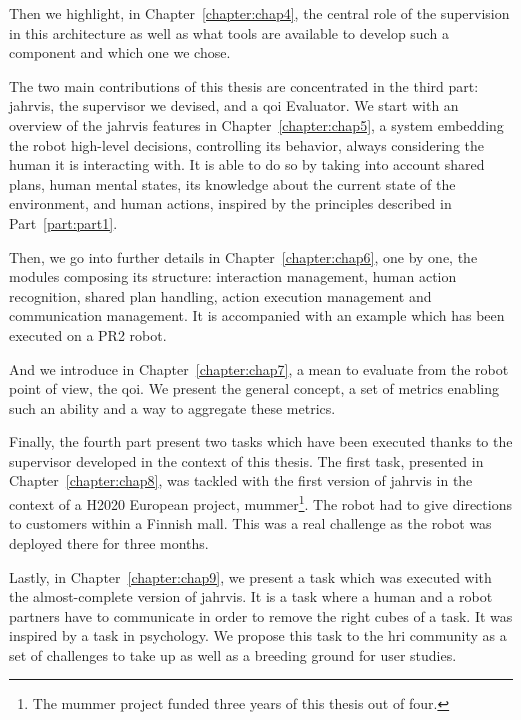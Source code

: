 \documentclass[a4paper,11pt,twoside]{StyleThese}
\begin{document}
Then we highlight, in Chapter~\ref{chapter:chap4}, the central role of the supervision in this architecture as well as what tools are available to develop such a component and which one we chose.

\bigskip

The two main contributions of this thesis are concentrated in the third part: \acrfull{jahrvis}, the supervisor we devised, and a \acrfull{qoi} Evaluator. We start with an overview of the \acrshort{jahrvis} features in Chapter~\ref{chapter:chap5}, \ie a system embedding the robot high-level decisions, controlling its behavior, always considering the human it is interacting with. It is able to do so by taking into account shared plans, human mental states, its knowledge about the current state of the environment, and human actions, inspired by the principles described in Part~\ref{part:part1}. 

Then, we go into further details in Chapter~\ref{chapter:chap6}, one by one, the modules composing its structure: interaction management, human action recognition, shared plan handling, action execution management and communication management. It is accompanied with an example which has been executed on a PR2 robot. 

And we introduce in Chapter~\ref{chapter:chap7}, a mean to evaluate from the robot point of view, the \acrlong{qoi}. We present the general concept, a set of metrics enabling such an ability and a way to aggregate these metrics. 

\bigskip

Finally, the fourth part present two tasks which have been executed thanks to the supervisor developed in the context of this thesis. The first task, presented in Chapter~\ref{chapter:chap8}, was tackled with the first version of \acrshort{jahrvis} in the context of a H2020 European project, \acrfull{mummer}\footnote{The \acrshort{mummer} project funded three years of this thesis out of four.}. The robot had to give directions to customers within a Finnish mall. This was a real challenge as the robot was deployed there for three months.

Lastly, in Chapter~\ref{chapter:chap9}, we present a task which was executed with the almost-complete version of \acrshort{jahrvis}. It is a task where a human and a robot partners have to communicate in order to remove the right cubes of a task. It was inspired by a task in psychology. We propose this task to the \acrshort{hri} community as a set of challenges to take up as well as a breeding ground for user studies.
\end{document}
